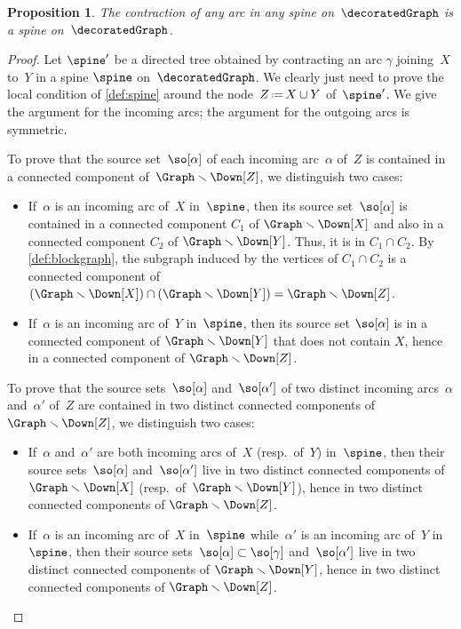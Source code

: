 \documentclass{amsart}
\newtheorem{proposition}[theorem]{Proposition}
\theoremstyle{definition}
\newcommand{\ssm}{\smallsetminus} %
\newcommand{\eqdef}{\mbox{\,\raisebox{0.2ex}{\scriptsize\ensuremath{\mathrm:}}\ensuremath{=}\,}} %
\begin{document}
\begin{proposition}
  \label{prop:arccontraction}
  The contraction of any arc in any spine on~$\decoratedGraph$ is a spine on~$\decoratedGraph$.
\end{proposition}

\begin{proof} 
  Let $\spine'$ be a directed tree obtained by contracting an arc $\gamma$ joining~$X$ to~$Y$ in a spine $\spine$ on~$\decoratedGraph$.
  We clearly just need to prove the local condition of \cref{def:spine} around the node~$Z \eqdef X \cup Y$ of~$\spine'$.
  We give the argument for the incoming arcs; the argument for the outgoing arcs is symmetric. 

  To prove that the source set~$\so[\alpha]$ of each incoming arc~$\alpha$ of~$Z$ is contained in a connected component of~$\Graph \ssm \Down[Z]$, we distinguish two cases:
  \begin{itemize}
    \item If~$\alpha$ is an incoming arc of~$X$ in~$\spine$, then its source set~$\so[\alpha]$ is contained in a connected component $C_1$ of $\Graph \ssm \Down[X]$ and also in a connected component $C_2$ of $\Graph \ssm \Down[Y]$. Thus, it is in $C_1 \cap C_2$. By \cref{def:blockgraph}, the subgraph induced by the vertices of $C_1 \cap C_2$ is a connected component of $(\Graph \ssm \Down[X]) \cap (\Graph \ssm \Down[Y]) = \Graph \ssm \Down[Z]$.
    \item If~$\alpha$ is an incoming arc of~$Y$ in~$\spine$, then its source set $\so[\alpha]$ is in a connected component of $\Graph \ssm \Down[Y]$ that does not contain $X$, hence in a connected component of $\Graph \ssm \Down[Z]$.
  \end{itemize}

  To prove that the source sets~$\so[\alpha]$ and~$\so[\alpha']$ of two distinct incoming arcs~$\alpha$ and~$\alpha'$ of~$Z$ are contained in two distinct connected components of~$\Graph \ssm \Down[Z]$, we distinguish two cases:
  \begin{itemize}
    \item If~$\alpha$ and~$\alpha'$ are both incoming arcs of~$X$ (resp.~of~$Y$) in~$\spine$, then their source sets~$\so[\alpha]$ and~$\so[\alpha']$ live in two distinct connected components of $\Graph \ssm \Down[X]$ (resp.~of~$\Graph \ssm \Down[Y]$), hence in two distinct connected components of $\Graph \ssm \Down[Z]$.
    \item If~$\alpha$ is an incoming arc of~$X$ in~$\spine$ while~$\alpha'$ is an incoming arc of~$Y$ in~$\spine$, then their source sets~$\so[\alpha] \subset \so[\gamma]$ and~$\so[\alpha']$ live in two distinct connected components of $\Graph \ssm \Down[Y]$, hence in two distinct connected components of $\Graph \ssm \Down[Z]$.
    \qedhere
  \end{itemize}
\end{proof}
\end{document}
